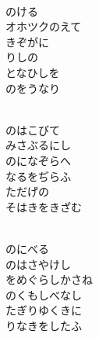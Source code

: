 \documentclass[10pt,b5j]{tarticle} %
\begin{document}
\vspace{1.5em} %
\newcommand{\linespace}{0.5em} %
\newcommand{\blocksize}{0.5\hsize} %
\newcommand{\itemmargin}{6em} %
\begin{enumerate} %
    \setlength{\itemindent}{\itemmargin} %
    \begin{minipage}[c]{\blocksize}
    
        \vspace{\linespace}
        \item~\\
        のける\\
        オホツクのえて\\
        きぞがに\\
        りしの\\
        となひしを\\
        のをうなり
        
        \vspace{\linespace}
        \item~\\
        のはこびて\\
        みさぶるにし\\
        のになぞらへ\\
        なるをぢらふ\\
        ただげの\\
        そはきをきざむ
        
        \vspace{\linespace}
        \item~\\
        のにべる\\
        のはさやけし\\
        をめぐらしかさね\\
        のくもしべなし\\
        たぎりゆくきに\\
        りなきをしたふ
        

\end{minipage}
\end{enumerate}
\end{document}

